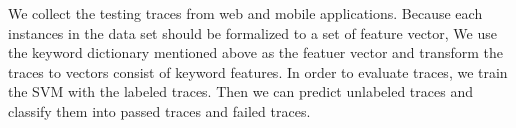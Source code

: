 We collect the testing traces from web and mobile applications.
Because each instances in the data set should be formalized to a set of feature vector,
We use the keyword dictionary mentioned above as the featuer vector and transform the traces to vectors consist of keyword features.
In order to evaluate traces, we train the SVM with the labeled traces.
Then we can predict unlabeled traces and classify them into passed traces and failed traces.




